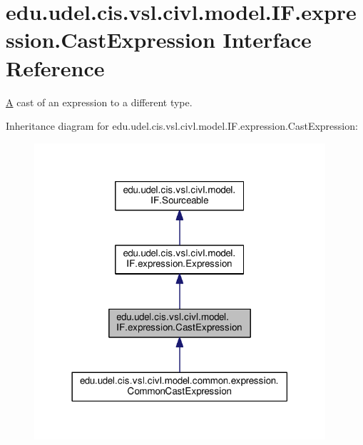 \hypertarget{interfaceedu_1_1udel_1_1cis_1_1vsl_1_1civl_1_1model_1_1IF_1_1expression_1_1CastExpression}{}\section{edu.\+udel.\+cis.\+vsl.\+civl.\+model.\+I\+F.\+expression.\+Cast\+Expression Interface Reference}
\label{interfaceedu_1_1udel_1_1cis_1_1vsl_1_1civl_1_1model_1_1IF_1_1expression_1_1CastExpression}


\hyperlink{structA}{A} cast of an expression to a different type.  




Inheritance diagram for edu.\+udel.\+cis.\+vsl.\+civl.\+model.\+I\+F.\+expression.\+Cast\+Expression\+:
\nopagebreak
\begin{figure}[H]
\begin{center}
\leavevmode
\includegraphics[width=306pt]{interfaceedu_1_1udel_1_1cis_1_1vsl_1_1civl_1_1model_1_1IF_1_1expression_1_1CastExpression__inherit__graph}
\end{center}
\end{figure}


